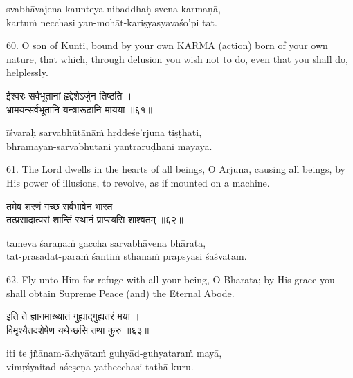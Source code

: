 \begin{transliteration}
svabhāvajena kaunteya nibaddhaḥ svena karmaṇā, \\
kartuṁ necchasi yan-mohāt-kariṣyasyavaśo'pi tat.
\end{transliteration}

60. O son of Kunti, bound by your own KARMA (action) born of your own nature,
that which, through delusion you wish not to do, even that you shall do,
helplessly.

\begin{gitaverse}
ईश्वरः सर्वभूतानां हृद्देशेऽर्जुन तिष्ठति । \\
भ्रामयन्सर्वभूतानि यन्त्रारूढानि मायया ॥६१॥
\end{gitaverse}

\begin{transliteration}
īśvaraḥ sarvabhūtānāṁ hṛddeśe'rjuna tiṣṭhati, \\
bhrāmayan-sarvabhūtāni yantrāruḍhāni māyayā.
\end{transliteration}

61. The Lord dwells in the hearts of all beings, O Arjuna, causing all beings,
by His power of illusions, to revolve, as if mounted on a machine.

\begin{gitaverse}
तमेव शरणं गच्छ सर्वभावेन भारत । \\
तत्प्रसादात्परां शान्तिं स्थानं प्राप्स्यसि शाश्वतम् ॥६२॥
\end{gitaverse}

\begin{transliteration}
tameva śaraṇaṁ gaccha sarvabhāvena bhārata, \\
tat-prasādāt-parāṁ śāntiṁ sthānaṁ prāpsyasi śāśvatam.
\end{transliteration}

62. Fly unto Him for refuge with all your being, O Bharata; by His grace you
shall obtain Supreme Peace (and) the Eternal Abode.

\begin{gitaverse}
इति ते ज्ञानमाख्यातं गुह्याद्गुह्यतरं मया । \\
विमृश्यैतदशेषेण यथेच्छसि तथा कुरु ॥६३॥
\end{gitaverse}

\begin{transliteration}
iti te jñānam-ākhyātaṁ guhyād-guhyataraṁ mayā, \\
vimṛśyaitad-aśeṣeṇa yathecchasi tathā kuru.
\end{transliteration}

